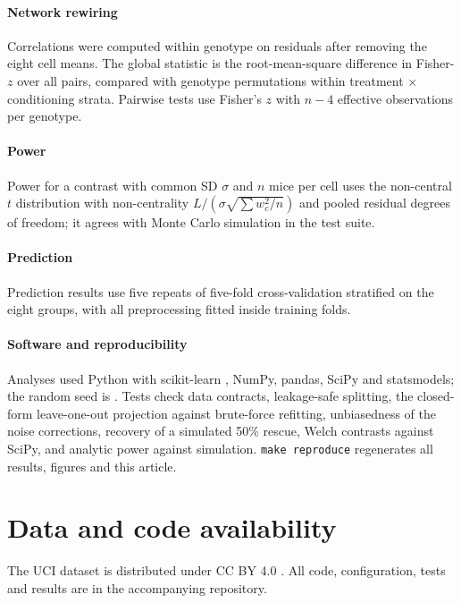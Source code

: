 \documentclass[10pt]{article}
\begin{document}
\paragraph{Network rewiring} Correlations were computed within genotype on residuals after
removing the eight cell means. The global statistic is the root-mean-square difference in
Fisher-$z$ over all pairs, compared with \NNetPerm{} genotype permutations within treatment
$\times$ conditioning strata. Pairwise tests use Fisher's $z$ with $n-4$ effective observations
per genotype.

\paragraph{Power} Power for a contrast with common SD $\sigma$ and $n$ mice per cell uses the
non-central $t$ distribution with non-centrality $L/(\sigma\sqrt{\sum w_c^2/n})$ and pooled
residual degrees of freedom; it agrees with Monte Carlo simulation in the test suite.

\paragraph{Prediction} Prediction results use five repeats of five-fold cross-validation
stratified on the eight groups, with all preprocessing fitted inside training folds.

\paragraph{Software and reproducibility} Analyses used Python \PyVersion{} with scikit-learn
\SklearnVersion, NumPy, pandas, SciPy and statsmodels; the random seed is \Seed. Tests check data
contracts, leakage-safe splitting, the closed-form leave-one-out projection against brute-force
refitting, unbiasedness of the noise corrections, recovery of a simulated 50\% rescue, Welch
contrasts against SciPy, and analytic power against simulation. \texttt{make reproduce}
regenerates all results, figures and this article.

\section*{Data and code availability}
The UCI dataset is distributed under CC BY 4.0 \cite{uci2015}. All code, configuration, tests and
results are in the accompanying repository.
\end{document}
